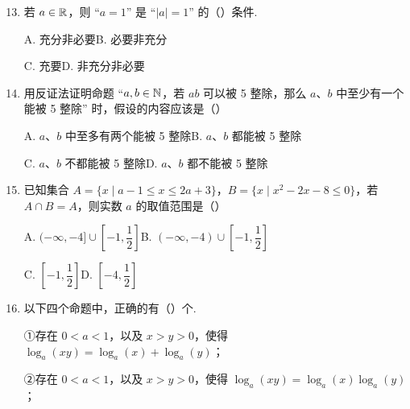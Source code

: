 \documentclass[a4paper,11pt]{article}
\begin{document}
\begin{enumerate}
\setcounter{enumi}{12}

\item 若 $a\in\mathbb{R}$，则 “$a=1$” 是 “$\lvert a\rvert=1$” 的\mbox{（\quad）}条件.

\keepwithprev
A. 充分非必要\qquad\qquad B. 必要非充分

C. 充要\qquad\qquad\qquad\quad D. 非充分非必要

\ifanswer
{}
\fi

\item 用反证法证明命题 “$a,b\in\mathbb{N}$，若 $ab$ 可以被 5 整除，那么 $a$、$b$ 中至少有一个能被 5 整除” 时，假设的内容应该是\mbox{（\quad）}

\keepwithprev
A. $a$、$b$ 中至多有两个能被 5 整除\qquad\qquad B. $a$、$b$ 都能被 5 整除

C. $a$、$b$ 不都能被 5 整除\qquad\qquad\qquad D. $a$、$b$ 都不能被 5 整除

\ifanswer
{}
\fi

\item 已知集合 $A=\{x\mid a-1\leqslant x\leqslant2a+3\}$，$B=\{x\mid x^2-2x-8\leqslant0\}$，若 $A\cap B=A$，则实数 $a$ 的取值范围是\mbox{（\quad）}

\keepwithprev
A. $(-\infty,-4]\cup\left[-1,\dfrac12\right]$\qquad\qquad B. $(-\infty,-4)\cup\left[-1,\dfrac12\right]$

C. $\left[-1,\dfrac12\right]$\qquad\qquad\qquad\qquad\qquad D. $\left[-4,\dfrac12\right]$

\ifanswer
\solbegin
{}
\solend
\fi

\item 以下四个命题中，正确的有\mbox{（\quad）}个.

①存在 $0<a<1$，以及 $x>y>0$，使得 $\log_a(xy)=\log_a(x)+\log_a(y)$；

②存在 $0<a<1$，以及 $x>y>0$，使得 $\log_a(xy)=\log_a(x)\log_a(y)$；


\end{enumerate}
\end{document}
